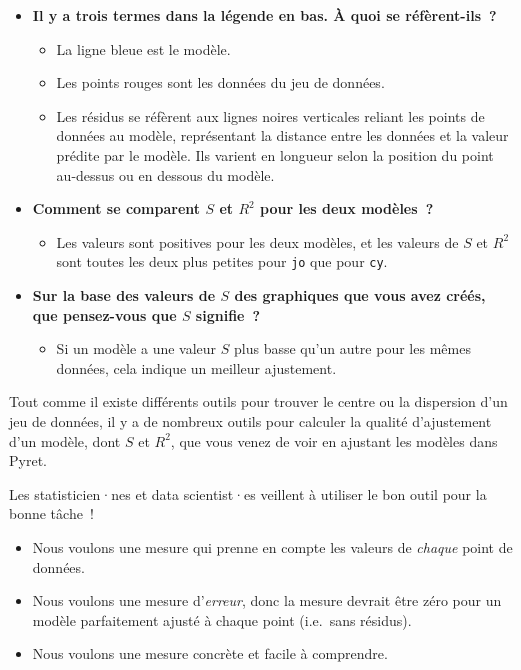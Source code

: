\documentclass[12pt,a4paper]{article}
\begin{document}
\begin{thinkbox}
  \begin{itemize}
    \item \textbf{Il y a trois termes dans la légende en bas. À quoi se réfèrent-ils~?}
    \begin{itemize}
      \item La ligne bleue est le modèle.
      \item Les points rouges sont les données du jeu de données.
      \item Les résidus se réfèrent aux lignes noires verticales reliant les points de données au modèle, représentant la distance entre les données et la valeur prédite par le modèle. Ils varient en longueur selon la position du point au-dessus ou en dessous du modèle.
    \end{itemize}
  \end{itemize}
\end{thinkbox}

\begin{thinkbox}
  \begin{itemize}
    \item \textbf{Comment se comparent $S$ et $R^2$ pour les deux modèles~?}
    \begin{itemize}
      \item Les valeurs sont positives pour les deux modèles, et les valeurs de $S$ et $R^2$ sont toutes les deux plus petites pour \texttt{jo} que pour \texttt{cy}.
    \end{itemize}
    \item \textbf{Sur la base des valeurs de $S$ des graphiques que vous avez créés, que pensez-vous que $S$ signifie~?}
    \begin{itemize}
      \item Si un modèle a une valeur $S$ plus basse qu'un autre pour les mêmes données, cela indique un meilleur ajustement.
    \end{itemize}
  \end{itemize}
\end{thinkbox}

\begin{keypointbox}
  Tout comme il existe différents outils pour trouver le centre ou la dispersion d'un jeu de données, il y a de nombreux outils pour calculer la qualité d'ajustement d'un modèle, dont $S$ et $R^2$, que vous venez de voir en ajustant les modèles dans Pyret.

  Les statisticien·nes et data scientist·es veillent à utiliser le bon outil pour la bonne tâche~!
  \begin{itemize}
    \item Nous voulons une mesure qui prenne en compte les valeurs de \emph{chaque} point de données.
    \item Nous voulons une mesure d'\emph{erreur}, donc la mesure devrait être zéro pour un modèle parfaitement ajusté à chaque point (i.e.\ sans résidus).
    \item Nous voulons une mesure concrète et facile à comprendre.
  \end{itemize}
\end{keypointbox}
\end{document}
